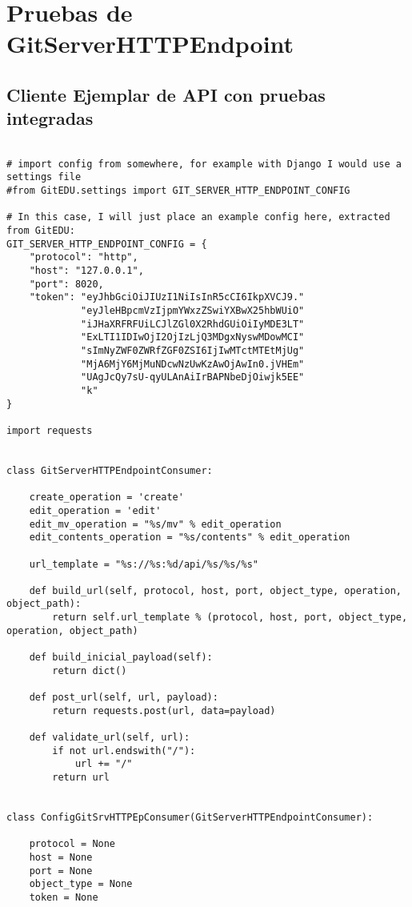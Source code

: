 \chapter{Pruebas de GitServerHTTPEndpoint}
\label{AnexoH}

\section{Cliente Ejemplar de API con pruebas integradas}
\lstset{language=Python}
\begin{lstlisting}[breaklines]

# import config from somewhere, for example with Django I would use a settings file
#from GitEDU.settings import GIT_SERVER_HTTP_ENDPOINT_CONFIG

# In this case, I will just place an example config here, extracted from GitEDU:
GIT_SERVER_HTTP_ENDPOINT_CONFIG = {
    "protocol": "http",
    "host": "127.0.0.1",
    "port": 8020,
    "token": "eyJhbGciOiJIUzI1NiIsInR5cCI6IkpXVCJ9."
             "eyJleHBpcmVzIjpmYWxzZSwiYXBwX25hbWUiO"
             "iJHaXRFRFUiLCJlZGl0X2RhdGUiOiIyMDE3LT"
             "ExLTI1IDIwOjI2OjIzLjQ3MDgxNyswMDowMCI"
             "sImNyZWF0ZWRfZGF0ZSI6IjIwMTctMTEtMjUg"
             "MjA6MjY6MjMuNDcwNzUwKzAwOjAwIn0.jVHEm"
             "UAgJcQy7sU-qyULAnAiIrBAPNbeDjOiwjk5EE"
             "k"
}

import requests


class GitServerHTTPEndpointConsumer:

    create_operation = 'create'
    edit_operation = 'edit'
    edit_mv_operation = "%s/mv" % edit_operation
    edit_contents_operation = "%s/contents" % edit_operation

    url_template = "%s://%s:%d/api/%s/%s/%s"

    def build_url(self, protocol, host, port, object_type, operation, object_path):
        return self.url_template % (protocol, host, port, object_type, operation, object_path)

    def build_inicial_payload(self):
        return dict()

    def post_url(self, url, payload):
        return requests.post(url, data=payload)

    def validate_url(self, url):
        if not url.endswith("/"):
            url += "/"
        return url


class ConfigGitSrvHTTPEpConsumer(GitServerHTTPEndpointConsumer):

    protocol = None
    host = None
    port = None
    object_type = None
    token = None


\end{lstlisting}
